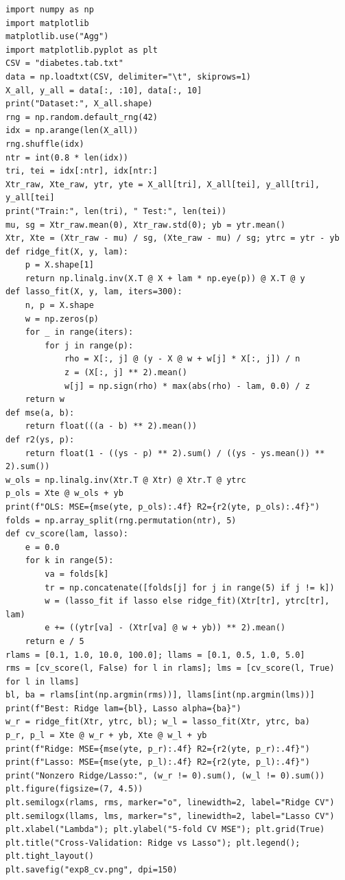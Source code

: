 \documentclass[11pt,twoside]{article}
\begin{document}
\begin{lstlisting}
import numpy as np
import matplotlib
matplotlib.use("Agg")
import matplotlib.pyplot as plt
CSV = "diabetes.tab.txt"
data = np.loadtxt(CSV, delimiter="\t", skiprows=1)
X_all, y_all = data[:, :10], data[:, 10]
print("Dataset:", X_all.shape)
rng = np.random.default_rng(42)
idx = np.arange(len(X_all))
rng.shuffle(idx)
ntr = int(0.8 * len(idx))
tri, tei = idx[:ntr], idx[ntr:]
Xtr_raw, Xte_raw, ytr, yte = X_all[tri], X_all[tei], y_all[tri], y_all[tei]
print("Train:", len(tri), " Test:", len(tei))
mu, sg = Xtr_raw.mean(0), Xtr_raw.std(0); yb = ytr.mean()
Xtr, Xte = (Xtr_raw - mu) / sg, (Xte_raw - mu) / sg; ytrc = ytr - yb
def ridge_fit(X, y, lam):
    p = X.shape[1]
    return np.linalg.inv(X.T @ X + lam * np.eye(p)) @ X.T @ y
def lasso_fit(X, y, lam, iters=300):
    n, p = X.shape
    w = np.zeros(p)
    for _ in range(iters):
        for j in range(p):
            rho = X[:, j] @ (y - X @ w + w[j] * X[:, j]) / n
            z = (X[:, j] ** 2).mean()
            w[j] = np.sign(rho) * max(abs(rho) - lam, 0.0) / z
    return w
def mse(a, b):
    return float(((a - b) ** 2).mean())
def r2(ys, p):
    return float(1 - ((ys - p) ** 2).sum() / ((ys - ys.mean()) ** 2).sum())
w_ols = np.linalg.inv(Xtr.T @ Xtr) @ Xtr.T @ ytrc
p_ols = Xte @ w_ols + yb
print(f"OLS: MSE={mse(yte, p_ols):.4f} R2={r2(yte, p_ols):.4f}")
folds = np.array_split(rng.permutation(ntr), 5)
def cv_score(lam, lasso):
    e = 0.0
    for k in range(5):
        va = folds[k]
        tr = np.concatenate([folds[j] for j in range(5) if j != k])
        w = (lasso_fit if lasso else ridge_fit)(Xtr[tr], ytrc[tr], lam)
        e += ((ytr[va] - (Xtr[va] @ w + yb)) ** 2).mean()
    return e / 5
rlams = [0.1, 1.0, 10.0, 100.0]; llams = [0.1, 0.5, 1.0, 5.0]
rms = [cv_score(l, False) for l in rlams]; lms = [cv_score(l, True) for l in llams]
bl, ba = rlams[int(np.argmin(rms))], llams[int(np.argmin(lms))]
print(f"Best: Ridge lam={bl}, Lasso alpha={ba}")
w_r = ridge_fit(Xtr, ytrc, bl); w_l = lasso_fit(Xtr, ytrc, ba)
p_r, p_l = Xte @ w_r + yb, Xte @ w_l + yb
print(f"Ridge: MSE={mse(yte, p_r):.4f} R2={r2(yte, p_r):.4f}")
print(f"Lasso: MSE={mse(yte, p_l):.4f} R2={r2(yte, p_l):.4f}")
print("Nonzero Ridge/Lasso:", (w_r != 0).sum(), (w_l != 0).sum())
plt.figure(figsize=(7, 4.5))
plt.semilogx(rlams, rms, marker="o", linewidth=2, label="Ridge CV")
plt.semilogx(llams, lms, marker="s", linewidth=2, label="Lasso CV")
plt.xlabel("Lambda"); plt.ylabel("5-fold CV MSE"); plt.grid(True)
plt.title("Cross-Validation: Ridge vs Lasso"); plt.legend(); plt.tight_layout()
plt.savefig("exp8_cv.png", dpi=150)
\end{lstlisting}
\end{document}
